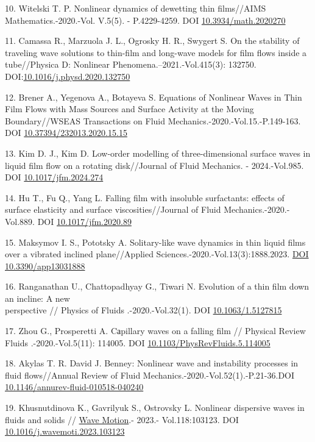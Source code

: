 \begin{references}
10. Witelski T. P. Nonlinear dynamics of dewetting thin films//AIMS
Mathematics.-2020.-Vol. V.5(5). - P.4229-4259. DOI
\href{http://dx.doi.org/10.3934/math.2020270}{10.3934/math.2020270}

11. Camassa R., Marzuola J. L., Ogrosky H. R., Swygert S. On the
stability of traveling wave solutions to thin-film and long-wave models
for film flows inside a tube//Physica D: Nonlinear
Phenomena.--2021.-Vol.415(3): 132750.
DOI:\href{http://dx.doi.org/10.1016/j.physd.2020.132750}{10.1016/j.physd.2020.132750}

12. Brener A., Yegenova A., Botayeva S. Equations of Nonlinear Waves in
Thin Film Flows with Mass Sources and Surface Activity at the Moving
Boundary//WSEAS Transactions on Fluid
Mechanics.-2020.-Vol.15.-P.149-163. DOI
\href{http://dx.doi.org/10.37394/232013.2020.15.15}{10.37394/232013.2020.15.15}

13. Kim D. J., Kim D. Low-order modelling of three-dimensional surface
waves in liquid film flow on a rotating disk//Journal of Fluid
Mechanics. - 2024.-Vol.985. DOI
\href{http://dx.doi.org/10.1017/jfm.2024.274}{10.1017/jfm.2024.274}

14. Hu T., Fu Q., Yang L. Falling film with insoluble surfactants:
effects of surface elasticity and surface viscosities//Journal of Fluid
Mechanics.-2020.-Vol.889. DOI
\href{http://dx.doi.org/10.1017/jfm.2020.89}{10.1017/jfm.2020.89}

15. Maksymov I. S., Pototsky A. Solitary-like wave dynamics in thin
liquid films over a vibrated inclined plane//Applied
Sciences.-2020.-Vol.13(3):1888.2023.
\href{https://doi.org/10.3390/app13031888}{DOI 10.3390/app13031888}

16. Ranganathan U., Chattopadhyay G., Tiwari N. Evolution of a thin film
down an incline: A new \\perspective // Physics of Fluids .-2020.-Vol.32(1).
DOI \href{http://dx.doi.org/10.1063/1.5127815}{10.1063/1.5127815}

17. Zhou G., Prosperetti A. Cаpillary waves on a falling film // Physical
Review Fluids .-2020.-Vol.5(11): 114005. DOI
\href{http://dx.doi.org/10.1103/PhysRevFluids.5.114005}{10.1103/PhysRevFluids.5.114005}

18. Akylas T. R. David J. Benney: Nonlinear wave and instability
processes in fluid flows//Annual Review of Fluid
Mechanics.-2020.-Vol.52(1).-P.21-36.DOI
\href{http://dx.doi.org/10.1146/annurev-fluid-010518-040240}{10.1146/annurev-fluid-010518-040240}

19. Khusnutdinova K., Gavrilyuk S., Ostrovsky L. Nonlinear dispersive
waves in fluids and solids //
\href{https://www.researchgate.net/journal/Wave-Motion-0165-2125?_tp=eyJjb250ZXh0Ijp7ImZpcnN0UGFnZSI6InB1YmxpY2F0aW9uIiwicGFnZSI6InB1YmxpY2F0aW9uIn19}{Wave
Motion}.- 2023.- Vol.118:103123. DOI
\href{http://dx.doi.org/10.1016/j.wavemoti.2023.103123}{10.1016/j.wavemoti.2023.103123}


\end{references}
